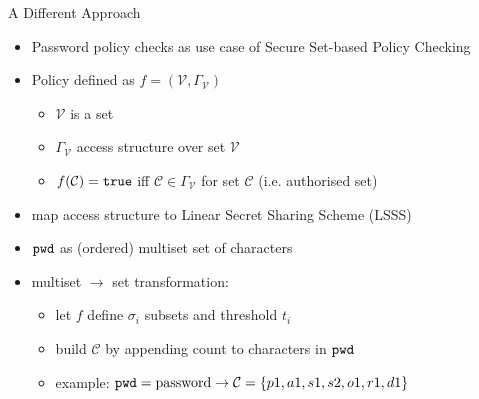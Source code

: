 \documentclass[notes,xcolor=dvipsnames]{beamer}
\begin{document}
\begin{frame}{A Different Approach}
  \begin{itemize}
    \item Password policy checks as use case of Secure Set-based Policy Checking
    \item Policy defined as $f=(\mathcal{V}, \Gamma_\mathcal{V})$
    \begin{itemize}
      \item $\mathcal{V}$ is a set
      \item $\Gamma_\mathcal{V}$ access structure over set $\mathcal{V}$
      \item $f(\mathcal{C})=\mathtt{true}$ iff $\mathcal{C}\in\Gamma_\mathcal{V}$ for set $\mathcal{C}$ (i.e. authorised set)
    \end{itemize}
    \item map access structure to Linear Secret Sharing Scheme (LSSS)
  \end{itemize}
  
  \begin{itemize}
    \item $\mathtt{pwd}$ as (ordered) multiset set of characters
    \item multiset $\rightarrow$ set transformation:
    \begin{itemize}
      \item let $f$ define $\sigma_i$ subsets and threshold $t_i$
      \item build $\mathcal{C}$ by appending count to characters in $\mathtt{pwd}$
      \item example: $\mathtt{pwd}=\text{password}\rightarrow\mathcal{C}=\{p1,a1,s1,s2,o1,r1,d1\}$
    \end{itemize}
  \end{itemize}
  
\end{frame}
\end{document}
